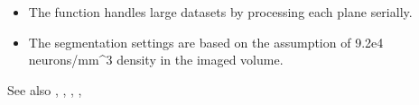 \documentclass[letterpaper,10pt,english]{sphinxmanual}
\begin{document}
\begin{fulllineitems}
\begin{itemize}
\item {} 
\sphinxAtStartPar
The function handles large datasets by processing each plane serially.

\item {} 
\sphinxAtStartPar
The segmentation settings are based on the assumption of 9.2e4 neurons/mm\textasciicircum{}3
density in the imaged volume.

\end{itemize}

\sphinxAtStartPar
See also , , , , 

\end{fulllineitems}

\end{document}
